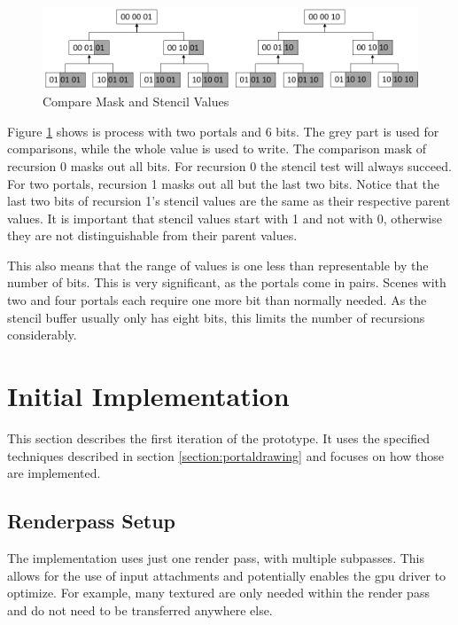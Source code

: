 \begin{figure}[h]
	\includegraphics[width=\linewidth]{images/stencilvalues2.png}
	\caption{Compare Mask and Stencil Values}
	\label{fig:stencilvalues}
\end{figure}

Figure \ref{fig:stencilvalues} shows is process with two portals and 6 bits. The grey part is used for comparisons, while the whole value is used to write. The comparison mask of recursion 0 masks out all bits. For recursion 0 the stencil test will always succeed. For two portals, recursion 1 masks out all but the last two bits. Notice that the last two bits of recursion 1's stencil values are the same as their respective parent values. It is important that stencil values start with 1 and not with 0, otherwise they are not distinguishable from their parent values.

This also means that the range of values is one less than representable by the number of bits. This is very significant, as the portals come in pairs. Scenes with two and four portals each require one more bit than normally needed. As the stencil buffer usually only has eight bits, this limits the number of recursions considerably.



\section{Initial Implementation}
\label{section:intialimplementation}
This section describes the first iteration of the prototype. It uses the specified techniques described in section \ref{section:portaldrawing} and focuses on how those are implemented.


\subsection{Renderpass Setup}
\label{section:renderpasssetup}

The implementation uses just one render pass, with multiple subpasses. This allows for the use of input attachments and potentially enables the \gls{gpu} driver to optimize. For example, many textured are only needed within the render pass and do not need to be transferred anywhere else.

